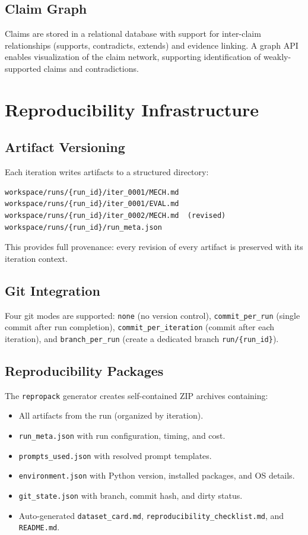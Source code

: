 \documentclass[11pt,a4paper]{article}
\begin{document}
\subsection{Claim Graph}
Claims are stored in a relational database with support for inter-claim relationships (supports, contradicts, extends) and evidence linking.
A graph API enables visualization of the claim network, supporting identification of weakly-supported claims and contradictions.


\section{Reproducibility Infrastructure}
\label{sec:reproducibility}

\subsection{Artifact Versioning}
Each iteration writes artifacts to a structured directory:
\begin{verbatim}
workspace/runs/{run_id}/iter_0001/MECH.md
workspace/runs/{run_id}/iter_0001/EVAL.md
workspace/runs/{run_id}/iter_0002/MECH.md  (revised)
workspace/runs/{run_id}/run_meta.json
\end{verbatim}
This provides full provenance: every revision of every artifact is preserved with its iteration context.

\subsection{Git Integration}
Four git modes are supported: \texttt{none} (no version control), \texttt{commit\_per\_run} (single commit after run completion), \texttt{commit\_per\_iteration} (commit after each iteration), and \texttt{branch\_per\_run} (create a dedicated branch \texttt{run/\{run\_id\}}).

\subsection{Reproducibility Packages}
The \texttt{repropack} generator creates self-contained ZIP archives containing:
\begin{itemize}[leftmargin=*]
  \item All artifacts from the run (organized by iteration).
  \item \texttt{run\_meta.json} with run configuration, timing, and cost.
  \item \texttt{prompts\_used.json} with resolved prompt templates.
  \item \texttt{environment.json} with Python version, installed packages, and OS details.
  \item \texttt{git\_state.json} with branch, commit hash, and dirty status.
  \item Auto-generated \texttt{dataset\_card.md}, \texttt{reproducibility\_checklist.md}, and \texttt{README.md}.
\end{itemize}
\end{document}
